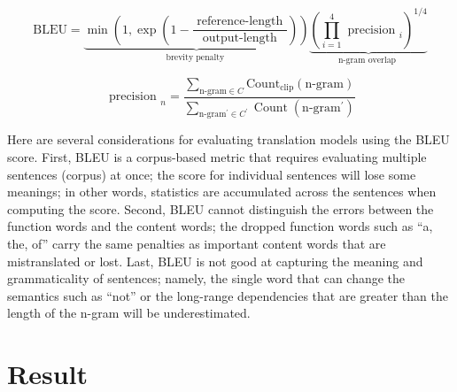 \begin{equation}
    \mathrm{BLEU}=\underbrace{\min \left(1, \exp \left(1-\frac{\text { reference-length }}{\text { output-length }}\right)\right)}_{\text {brevity penalty }} \underbrace{\left(\prod_{i=1}^{4} \text { precision }_{i}\right)^{1 / 4}}_{\text {n-gram overlap }} \label{eq:eq16}
\end{equation}

\begin{equation}
    \text { precision }_{n} = \frac{\sum_{ \text {n-gram} \in C} \text {Count}_{\text {clip}}(\text {n-gram})}{\sum_{\text{n-gram}^{\prime} \in C^{\prime}} \operatorname{Count}\left(\text{n-gram}^{\prime}\right)} \label{eq:eq17}
\end{equation}

Here are several considerations for evaluating translation models using the BLEU score. First, BLEU is a corpus-based metric that requires evaluating multiple sentences (corpus) at once; the score for individual sentences will lose some meanings; in other words, statistics are accumulated across the sentences when computing the score. Second, BLEU cannot distinguish the errors between the function words and the content words; the dropped function words such as ``a, the, of'' carry the same penalties as important content words that are mistranslated or lost. Last, BLEU is not good at capturing the meaning and grammaticality of sentences; namely, the single word that can change the semantics such as ``not'' or the long-range dependencies that are greater than the length of the n-gram will be underestimated.

\section{Result} \label{sec:result}





